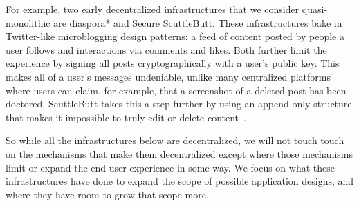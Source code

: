 For example, two early decentralized infrastructures that we consider quasi-monolithic are diaspora* and Secure ScuttleButt.
These infrastructures bake in Twitter-like microblogging design patterns: a feed of content posted by people a user follows and interactions via comments and likes.
Both further limit the experience by signing all posts cryptographically with a user's public key. This makes all of a user's messages undeniable, unlike many centralized platforms where users can claim, for example, that a screenshot of a deleted post has been doctored.
ScuttleButt takes this a step further by using an append-only structure that makes it impossible to truly edit or delete content~\cite{diaspora, securescuttlebutt}.



So while all the infrastructures below are decentralized,
we will not touch touch on the mechanisms that make them decentralized except where those mechanisms limit or expand the end-user experience in some way.
We focus on what these infrastructures have done to expand the scope of possible application designs, and where they have room to grow that scope more.


